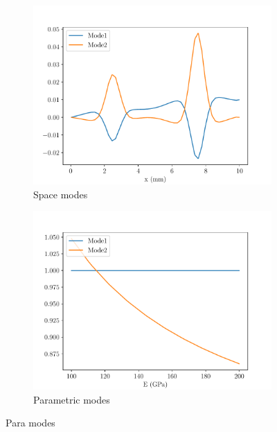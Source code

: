 \begin{figure}
\begin{subfigure}[t]{0.5\linewidth}
    \centering
    \includegraphics[width=\linewidth]{Figures/Pre_trained_Space_modes2.pdf}
    \caption{Space modes}
\end{subfigure}
  \begin{subfigure}[t]{0.5\linewidth}
    \centering
    \includegraphics[width=\linewidth]{Figures/Pre_trained_Para_modes2.pdf}
    \caption{Parametric modes}
\end{subfigure}  
    \caption{Para modes}
    \label{fig:SpaceModesBCs}
\end{figure}



